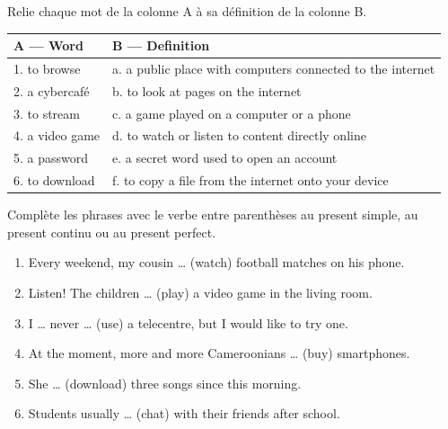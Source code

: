 \documentclass[11pt]{article}
\newcounter{popsec}
\newcounter{popsub}
\newcommand{\courssub}[1]{%
  \stepcounter{popsub}%
  \par\vspace{9pt}\noindent{\popxbold\fontsize{11.5}{13}\selectfont\color{popink}{\color{poporange}\thepopsec.\thepopsub}\hspace{6pt}#1}\par\nopagebreak\vspace{4pt}
}
\begin{document}
\begin{exercice}
Relie chaque mot de la colonne A à sa définition de la colonne B.
\begin{center}
\begin{tabularx}{\linewidth}{|l|X|}
\hline
\rowcolor{popblueL} \textbf{A — Word} & \textbf{B — Definition} \\
\hline
1. to browse & a. a public place with computers connected to the internet \\
\hline
2. a cybercafé & b. to look at pages on the internet \\
\hline
3. to stream & c. a game played on a computer or a phone \\
\hline
4. a video game & d. to watch or listen to content directly online \\
\hline
5. a password & e. a secret word used to open an account \\
\hline
6. to download & f. to copy a file from the internet onto your device \\
\hline
\end{tabularx}
\end{center}
\end{exercice}

\begin{exercice}
Complète les phrases avec le verbe entre parenthèses au present simple, au present continu ou au present perfect.
\begin{enumerate}
\item Every weekend, my cousin \dots{} (watch) football matches on his phone.
\item Listen! The children \dots{} (play) a video game in the living room.
\item I \dots{} never \dots{} (use) a telecentre, but I would like to try one.
\item At the moment, more and more Cameroonians \dots{} (buy) smartphones.
\item She \dots{} (download) three songs since this morning.
\item Students usually \dots{} (chat) with their friends after school.
\end{enumerate}
\end{exercice}

\courssub{Je m'entraîne}
\end{document}
